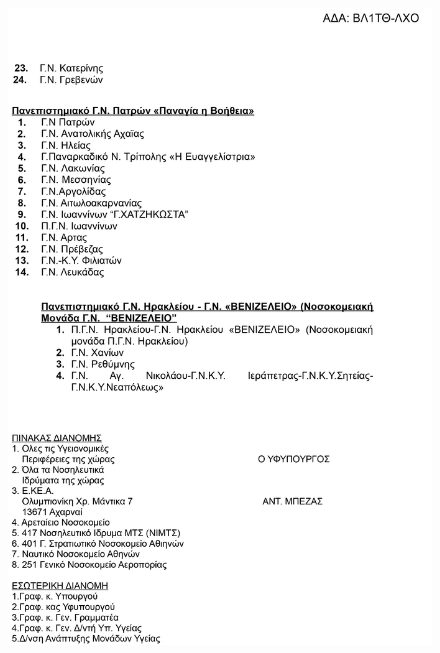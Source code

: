 	\begin{figure}[H]
	    \centering
	    \includegraphics[width=1\textwidth]{blood_centers_3.png}
	\end{figure}
